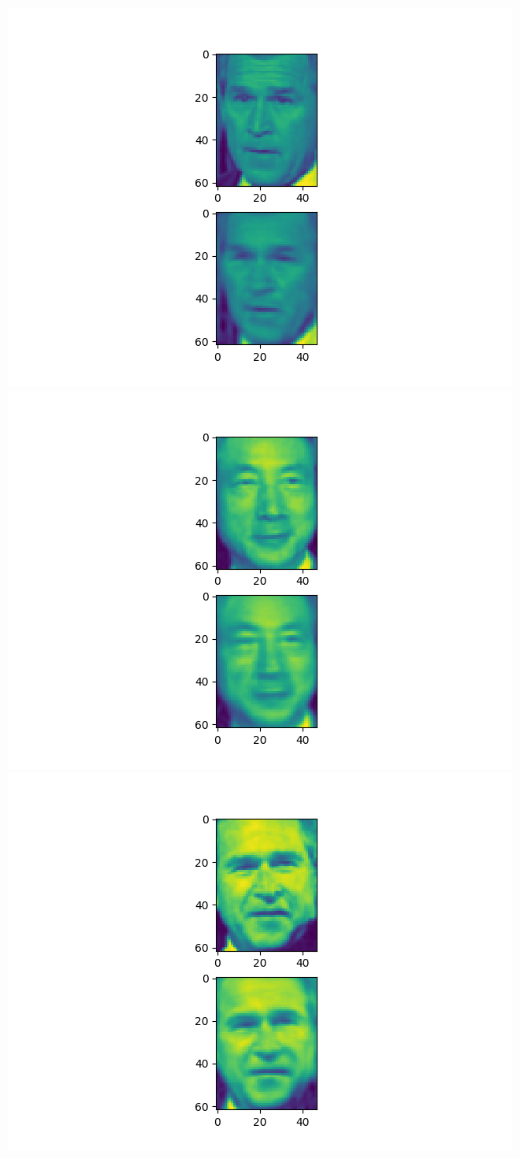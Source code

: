 \documentclass[twoside,10pt]{article}
\theoremstyle{definition}
\theoremstyle{definition}
\theoremstyle{remark}
\renewcommand{\>}{{\rightarrow}}
\newcommand{\1}{{\mathbf 1}}
\newcommand{\0}{{\mathbf 0}}
\begin{document}
\begin{enumerate}
  \includegraphics[width=\textwidth]{reconstruct_Im1.png}
  \includegraphics[width=\textwidth]{reconstruct_Im2.png}
  \includegraphics[width=\textwidth]{reconstruct_Im3.png}

\end{enumerate}
\end{document}
